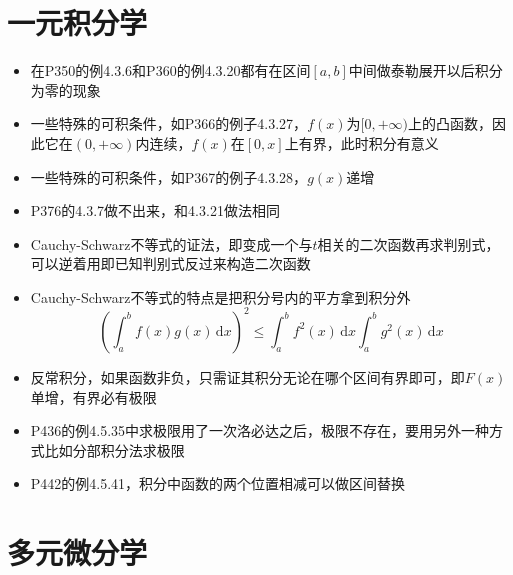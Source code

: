 \documentclass[UTF8]{ctexart}
\newcommand{\ud}{\,\mathrm{d}}
\begin{document}
\section{一元积分学}
\begin{itemize}
\item 在P350的例4.3.6和P360的例4.3.20都有在区间$[a,b]$中间做泰勒展开以后积分为零的现象

\item 一些特殊的可积条件，如P366的例子4.3.27，$f(x)$为$[0,+\infty)$上的凸函数，因此它在$(0,+\infty)$内连续，$f(x)$在$[0,x]$上有界，此时积分有意义

\item 一些特殊的可积条件，如P367的例子4.3.28，$g(x)$递增

\item P376的4.3.7做不出来，和4.3.21做法相同

\item Cauchy-Schwarz不等式的证法，即变成一个与$t$相关的二次函数再求判别式，可以逆着用即已知判别式反过来构造二次函数

\item Cauchy-Schwarz不等式的特点是把积分号内的平方拿到积分外
\[
\left(\int_a^b f(x)g(x)\ud x \right)^2 \leq \int_a^b f^2(x)\ud x \int_a^b g^2(x)\ud x
\]

\item 反常积分，如果函数非负，只需证其积分无论在哪个区间有界即可，即$F(x)$单增，有界必有极限

\item P436的例4.5.35中求极限用了一次洛必达之后，极限不存在，要用另外一种方式比如分部积分法求极限

\item P442的例4.5.41，积分中函数的两个位置相减可以做区间替换

\end{itemize}

\section{多元微分学}
\end{document}

